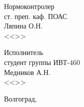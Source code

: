 {\begin{minipage}[c]{15em}
Нормоконтролер\\
ст. преп. каф. ПОАС\\
\makebox[2cm]{\hrulefill}Ляпина О.Н.\\
<<\makebox[1.5cm]{\hrulefill}>>\makebox[3.5cm]{\hrulefill}\the\year
\end{minipage}
\hfill
\begin{minipage}[c]{15em}
Исполнитель\\
студент группы ИВТ-460\\
\makebox[2cm]{\hrulefill}Медников А.Н.\\
<<\makebox[1.5cm]{\hrulefill}>>\makebox[3.5cm]{\hrulefill}\the\year
\end{minipage}
\vspace{15mm}
\begin{center}
Волгоград, \the\year
\end{center}
}